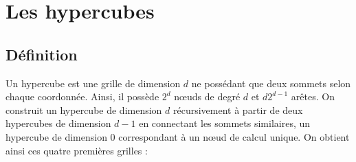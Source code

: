 \section{Les hypercubes}

\subsection{Définition}
Un hypercube est une grille de dimension $d$ ne possédant que deux sommets selon chaque coordonnée. Ainsi, il possède $2^d$ nœuds de degré $d$ et $d2^{d-1}$ arêtes. On construit un hypercube de dimension $d$ récursivement à partir de deux hypercubes de dimension $d-1$ en connectant les sommets similaires, un hypercube de dimension 0 correspondant à un nœud de calcul unique. On obtient ainsi ces quatre premières grilles :
\\
